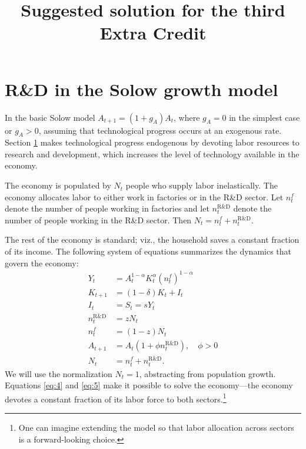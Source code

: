 \documentclass[12pt]{pracjourn_rwr}
\title{Suggested solution for the third  Extra Credit}
\theoremstyle{definition}
\theoremstyle{remark}
\begin{document}
\maketitle

\tableofcontents

\section{R\&D in the Solow growth model}
\label{sec:rd-solow-growth}

In the basic Solow model $A_{t+1} = (1+g_{A})A_{t}$,
where $g_{A} = 0$ in the simplest case or $g_{A} > 0$,
assuming that technological progress occurs at an exogenous rate.
Section \ref{sec:rd-solow-growth} makes technological progress endogenous
by devoting labor resources to research and development,
which increases the level of technology available in the economy.

The economy is populated by $N_{t}$ people who supply labor inelastically.
The economy allocates labor to either work in factories or in the R\&D sector.
Let $n_{t}^{f}$ denote the number of people working in factories and
let $n_{t}^{\text{R\&D}}$ denote the number of people working in the R\&D sector.
Then $N_{t} = n_{t}^{f} + n_{t}^{\text{R\&D}}$.

The rest of the economy is standard; viz.,
the household saves a constant fraction of its income.
The following system of equations summarizes the dynamics that govern the economy:
\begin{align}
\label{eq:1}
Y_{t} &= A_{t}^{1-\alpha} K_{t}^{\alpha} \left( n_{t}^{f} \right)^{1-\alpha} \\
\label{eq:2}
K_{t+1} &= (1-\delta)K_{t} + I_{t} \\
\label{eq:3}
I_{t} &= S_{t} = sY_{t} \\
\label{eq:4}
n_{t}^{\text{R\&D}} &= zN_{t} \\
\label{eq:5}
n_{t}^{f} &= (1-z)N_{t} \\
\label{eq:6}
A_{t+1} &= A_{t} \left( 1+\phi n_{t}^{\text{R\&D}} \right), \quad \phi > 0 \\
\label{eq:7}
N_{t} &= n_{t}^{f} + n_{t}^{\text{R\&D}}. 
\end{align}
We will use the normalization $N_{t} = 1$, abstracting from population growth.
Equations \eqref{eq:4} and \eqref{eq:5} make it possible to solve the economy---the economy devotes a constant fraction of its labor force to both sectors.\footnote{One can imagine extending the model so that labor allocation across sectors is a forward-looking choice.}
\end{document}
